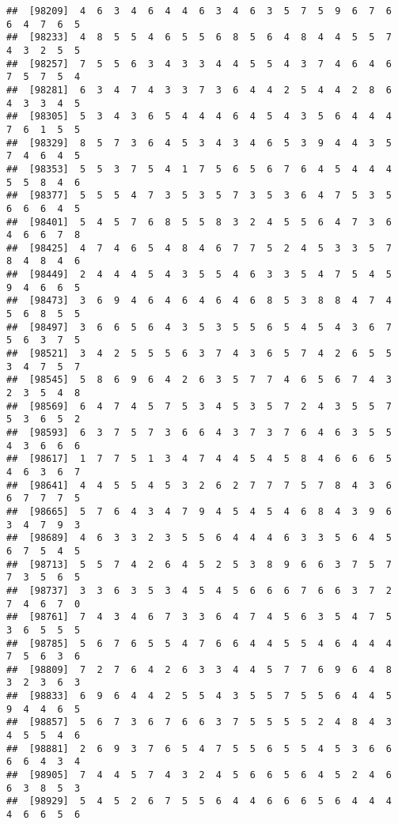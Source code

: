 \documentclass[
]{book}
\begin{document}
\begin{verbatim}
##  [98209]  4  6  3  4  6  4  4  6  3  4  6  3  5  7  5  9  6  7  6  6  4  7  6  5
##  [98233]  4  8  5  5  4  6  5  5  6  8  5  6  4  8  4  4  5  5  7  4  3  2  5  5
##  [98257]  7  5  5  6  3  4  3  3  4  4  5  5  4  3  7  4  6  4  6  7  5  7  5  4
##  [98281]  6  3  4  7  4  3  3  7  3  6  4  4  2  5  4  4  2  8  6  4  3  3  4  5
##  [98305]  5  3  4  3  6  5  4  4  4  6  4  5  4  3  5  6  4  4  4  7  6  1  5  5
##  [98329]  8  5  7  3  6  4  5  3  4  3  4  6  5  3  9  4  4  3  5  7  4  6  4  5
##  [98353]  5  5  3  7  5  4  1  7  5  6  5  6  7  6  4  5  4  4  4  5  5  8  4  6
##  [98377]  5  5  5  4  7  3  5  3  5  7  3  5  3  6  4  7  5  3  5  6  6  6  4  5
##  [98401]  5  4  5  7  6  8  5  5  8  3  2  4  5  5  6  4  7  3  6  4  6  6  7  8
##  [98425]  4  7  4  6  5  4  8  4  6  7  7  5  2  4  5  3  3  5  7  8  4  8  4  6
##  [98449]  2  4  4  4  5  4  3  5  5  4  6  3  3  5  4  7  5  4  5  9  4  6  6  5
##  [98473]  3  6  9  4  6  4  6  4  6  4  6  8  5  3  8  8  4  7  4  5  6  8  5  5
##  [98497]  3  6  6  5  6  4  3  5  3  5  5  6  5  4  5  4  3  6  7  5  6  3  7  5
##  [98521]  3  4  2  5  5  5  6  3  7  4  3  6  5  7  4  2  6  5  5  3  4  7  5  7
##  [98545]  5  8  6  9  6  4  2  6  3  5  7  7  4  6  5  6  7  4  3  2  3  5  4  8
##  [98569]  6  4  7  4  5  7  5  3  4  5  3  5  7  2  4  3  5  5  7  5  3  6  5  2
##  [98593]  6  3  7  5  7  3  6  6  4  3  7  3  7  6  4  6  3  5  5  4  3  6  6  6
##  [98617]  1  7  7  5  1  3  4  7  4  4  5  4  5  8  4  6  6  6  5  4  6  3  6  7
##  [98641]  4  4  5  5  4  5  3  2  6  2  7  7  7  5  7  8  4  3  6  6  7  7  7  5
##  [98665]  5  7  6  4  3  4  7  9  4  5  4  5  4  6  8  4  3  9  6  3  4  7  9  3
##  [98689]  4  6  3  3  2  3  5  5  6  4  4  4  6  3  3  5  6  4  5  6  7  5  4  5
##  [98713]  5  5  7  4  2  6  4  5  2  5  3  8  9  6  6  3  7  5  7  7  3  5  6  5
##  [98737]  3  3  6  3  5  3  4  5  4  5  6  6  6  7  6  6  3  7  2  7  4  6  7  0
##  [98761]  7  4  3  4  6  7  3  3  6  4  7  4  5  6  3  5  4  7  5  3  6  5  5  5
##  [98785]  5  6  7  6  5  5  4  7  6  6  4  4  5  5  4  6  4  4  4  7  5  6  3  6
##  [98809]  7  2  7  6  4  2  6  3  3  4  4  5  7  7  6  9  6  4  8  3  2  3  6  3
##  [98833]  6  9  6  4  4  2  5  5  4  3  5  5  7  5  5  6  4  4  5  9  4  4  6  5
##  [98857]  5  6  7  3  6  7  6  6  3  7  5  5  5  5  2  4  8  4  3  4  5  5  4  6
##  [98881]  2  6  9  3  7  6  5  4  7  5  5  6  5  5  4  5  3  6  6  6  6  4  3  4
##  [98905]  7  4  4  5  7  4  3  2  4  5  6  6  5  6  4  5  2  4  6  6  3  8  5  3
##  [98929]  5  4  5  2  6  7  5  5  6  4  4  6  6  6  5  6  4  4  4  4  6  6  5  6

\end{verbatim}
\end{document}
